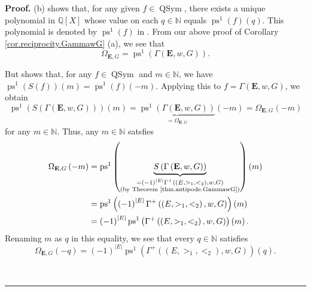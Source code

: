 \documentclass[numbers=enddot,12pt,final,onecolumn,notitlepage,abstracton]{scrartcl}%
\theoremstyle{definition}
\newenvironment{proof}[1][Proof]{\noindent\textbf{#1.} }{\ \rule{0.5em}{0.5em}}
\newcommand{\QSym}{{\operatorname{QSym}}}
\newcommand{\EE}{{\mathbf{E}}}
\newcommand{\NN}{{\mathbb{N}}}
\newcommand{\QQ}{{\mathbb{Q}}}
\begin{document}
\begin{proof}
(b) \cite[Proposition 7.7 (i)]{Reiner} shows that, for any given
$f\in \QSym $, there exists a unique polynomial in $\QQ
\left[  X\right]  $ whose value on each $q\in \NN $ equals
$\operatorname{ps}^{1}\left(  f\right)  \left(  q\right)  $. This
polynomial is denoted by $\operatorname{ps}^{1}\left(  f\right)  $
in \cite[Proposition 7.7]{Reiner}. From our above proof of Corollary
\ref{cor.reciprocity.GammawG} (a), we see that
\[
\Omega_{\mathbf{E},G}=\operatorname{ps}^{1}\left(  \Gamma\left(
 \EE ,w,G\right)  \right)  .
\]


But \cite[Proposition 7.7 (iii)]{Reiner} shows that, for any
$f \in \QSym$ and $m \in \NN$, we have
$\operatorname{ps}^{1}\left(  S\left(  f\right)  \right)
\left(  m\right)
=\operatorname{ps}^{1}\left(  f\right)  \left(  -m\right)  $.
Applying this to $f=\Gamma\left(   \EE ,w,G\right)  $, we obtain
\[
\operatorname{ps}^{1}\left(  S\left(  \Gamma\left(  {\mathbf{E}%
},w,G\right)  \right)  \right)  \left(  m\right)
=\underbrace{\operatorname{ps}^{1}\left(  \Gamma\left(  {\mathbf{E}%
},w,G\right)  \right)  }_{=\Omega_{\mathbf{E},G}}\left(  -m\right)
=\Omega_{\mathbf{E},G}\left(  -m\right)
\]
for any $m\in \NN $. Thus, any $m\in \NN $ satsfies%
\begin{align*}
\Omega_{\mathbf{E},G}\left(  -m\right)   &  =\operatorname{ps}^{1}%
\left(  \underbrace{S\left(  \Gamma\left(  \EE ,w,G\right)  \right)
}_{\substack{=\left(  -1\right)  ^{\left\vert E\right\vert }\Gamma^{+}\left(
\left(  E,>_{1},<_{2}\right)  ,w,G\right)  \\\text{(by Theorem
\ref{thm.antipode.GammawG})}}}\right)  \left(  m\right) \\
&  =\operatorname{ps}^{1}\left(  \left(  -1\right)  ^{\left\vert
E\right\vert }\Gamma^{+}\left(  \left(  E,>_{1},<_{2}\right)  ,w,G\right)
\right)  \left(  m\right) \\
&  =\left(  -1\right)  ^{\left\vert E\right\vert }
\operatorname{ps}^{1}
\left(  \Gamma^{+}\left(  \left(  E,>_{1},<_{2}\right)
,w,G\right)  \right)  \left(  m\right)  .
\end{align*}
Renaming $m$ as $q$ in this equality, we see that every $q\in \NN $
satisfies
\begin{equation}
\Omega_{\mathbf{E},G}\left(  -q\right)  =\left(  -1\right)  ^{\left\vert
E\right\vert }\operatorname{ps}^{1}\left(  \Gamma^{+}\left(  \left(
E,>_{1},<_{2}\right)  ,w,G\right)  \right)  \left(  q\right)  .
\label{pf.cor.reciprocity.GammawG.b.2}
\end{equation}



\end{proof}
\end{document}
